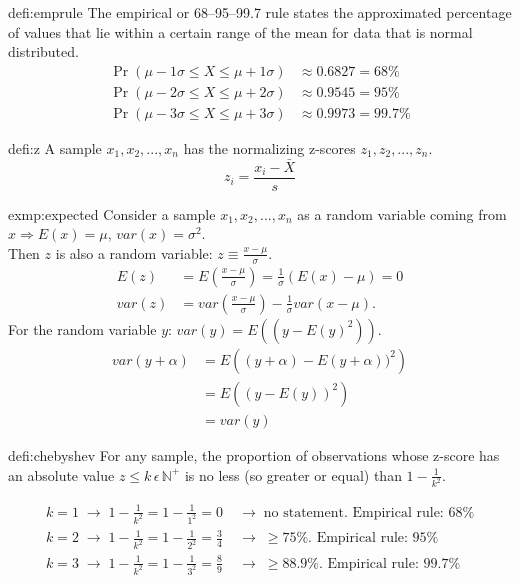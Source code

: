 		\begin{defi}{defi:emprule}
			The empirical or 68–95–99.7 rule states the approximated percentage of values that lie within a certain range of the mean for data that is normal distributed.
			\begin{align*}
				\Pr(\mu-1\sigma \le X \le \mu+1\sigma) &\approx 0.6827 =68\% \\
				\Pr(\mu-2\sigma \le X \le \mu+2\sigma) &\approx 0.9545 =95\%\\
				\Pr(\mu-3\sigma \le X \le \mu+3\sigma) &\approx 0.9973 =99.7\%
			\end{align*}
		\end{defi}	
		\begin{defi}[z-score]{defi:z}
			A sample $x_1,x_2,...,x_n$ has the normalizing z-scores $z_1,z_2,...,z_n$.
			\begin{equation*}
				z_i=\frac{x_i-\bar{X}}{s}
			\end{equation*}
		\end{defi}
		\begin{exmp}{exmp:expected}
			Consider a  sample $x_1,x_2,...,x_n$ as a random variable coming from $x\Rightarrow E(x) =\mu ,\, var(x) =\sigma^2$.\\
			Then $z$ is also a random variable: $z\equiv\frac{x-\mu}{\sigma}$.
			\begin{align*}
				E(z)&=E(\frac{x-\mu}{\sigma})=\frac{1}{\sigma}\left(E(x)-\mu\right)=0\\
				var(z)&=var(\frac{x-\mu}{\sigma})-\frac{1}{\sigma}var(x-\mu).
			\end{align*}
			For the random variable $y$: $var(y)=E\left((y-E(y)^2)\right)$.
			\begin{align*}
				var(y+\alpha)&=E\left((y+\alpha)-E(y+\alpha))^2\right)\\
				&=E\left((y-E(y))^2\right)\\
				&=var(y)
			\end{align*}			
		\end{exmp}
		\begin{defi}{defi:chebyshev}
			For any sample, the proportion of observations whose z-score has an absolute value $z\leq k\,\epsilon\,\mathbb{N}^+$ is no less (so greater or equal) than $1-\frac{1}{k^2}$.
		\end{defi}
		\begin{align*}
			k=1\;\longrightarrow\; 1-\frac{1}{k^2}=1-\frac{1}{1^2}=0\;&\longrightarrow\;\text{no statement. Empirical rule: }68\%\\
			k=2\;\longrightarrow\; 1-\frac{1}{k^2}=1-\frac{1}{2^2}=\frac{3}{4}\;&\longrightarrow\;\geq 75\%\text{. Empirical rule: }95\%\\
			k=3\;\longrightarrow\; 1-\frac{1}{k^2}=1-\frac{1}{3^2}=\frac{8}{9}\;&\longrightarrow\;\geq 88.9\%\text{. Empirical rule: }99.7\%\\
		\end{align*}
